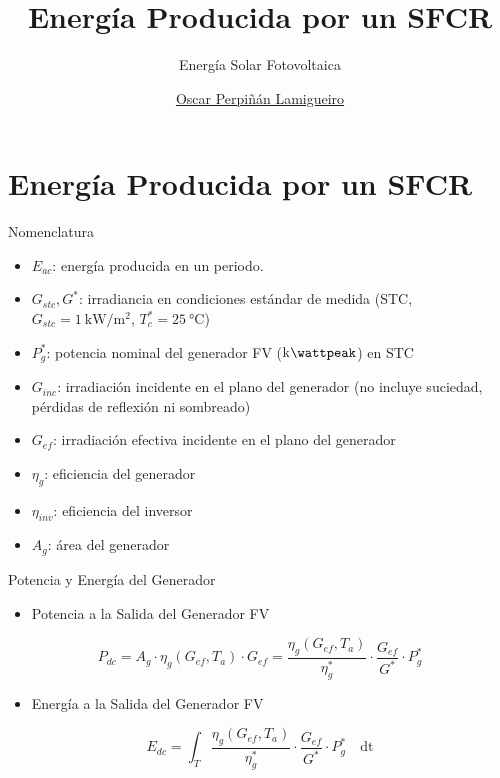 \documentclass[aspectratio=169, usenames,svgnames,dvipsnames]{beamer}
\author{\href{https://oscarperpinan.github.io}{Oscar Perpiñán Lamigueiro}}
\date{}
\title{Energía Producida por un SFCR}
\subtitle{Energía Solar Fotovoltaica}
\institute[UPM]{Universidad Politécnica de Madrid}
\begin{document}
\maketitle

\section{Energía Producida por un SFCR}
\label{sec:org7b36448}

\begin{frame}[label={sec:org4b9810f}]{Nomenclatura}
\begin{itemize}
\item \(E_{ac}\): energía producida en un periodo.
\item \(G_{stc}, G^*\): irradiancia en condiciones estándar de medida (STC,
\(G_{stc}=\SI{1}{\kilo\watt\per\meter\squared}\),
\(T^*_c=\SI{25}{\celsius}\))
\item \(P_{g}^{*}\): potencia nominal del generador FV
(\(\si{\kilo\wattpeak}\)) en STC
\item \(G_{inc}\): irradiación incidente en el plano del
generador (no incluye suciedad, pérdidas de reflexión ni sombreado)
\item \(G_{ef}\): irradiación efectiva incidente en el plano del
generador
\item \(\eta_g\): eficiencia del generador
\item \(\eta_{inv}\): eficiencia del inversor
\item \(A_g\): área del generador
\end{itemize}
\end{frame}

\begin{frame}[label={sec:org8e2e439}]{Potencia y Energía del Generador}
\begin{itemize}
\item \alert{Potencia} a la Salida del Generador FV
\end{itemize}
\[
  P_{dc} = A_g \cdot \eta_g(G_{ef}, T_a) \cdot  G_{ef} = %
  \frac{\eta_g(G_{ef}, T_a)}{\eta_g^*} \cdot \frac{G_{ef}}{G^*} \cdot P_g^*
\]

\begin{itemize}
\item \alert{Energía} a la Salida del Generador FV
\end{itemize}

\[
  E_{dc} = \int_T \frac{\eta_g(G_{ef}, T_a)}{\eta_g^*} \cdot
  \frac{G_{ef}}{G^*} \cdot P_g^*\quad \mathrm{dt}
\]
\end{frame}
\end{document}

